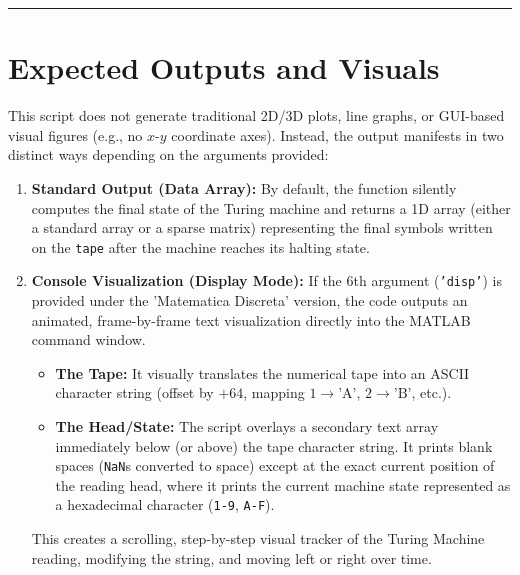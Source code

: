 \vspace{1em}
\hrule
\vspace{1em}

\section*{Expected Outputs and Visuals}

This script does not generate traditional 2D/3D plots, line graphs, or GUI-based visual figures (e.g., no $x$-$y$ coordinate axes). Instead, the output manifests in two distinct ways depending on the arguments provided:

\begin{enumerate}
    \item \textbf{Standard Output (Data Array):} By default, the function silently computes the final state of the Turing machine and returns a 1D array (either a standard array or a sparse matrix) representing the final symbols written on the \texttt{tape} after the machine reaches its halting state. 
    \item \textbf{Console Visualization (Display Mode):} If the 6th argument (\texttt{'disp'}) is provided under the 'Matematica Discreta' version, the code outputs an animated, frame-by-frame text visualization directly into the MATLAB command window. 
    \begin{itemize}
        \item \textbf{The Tape:} It visually translates the numerical tape into an ASCII character string (offset by $+64$, mapping $1 \rightarrow \text{'A'}$, $2 \rightarrow \text{'B'}$, etc.). 
        \item \textbf{The Head/State:} The script overlays a secondary text array immediately below (or above) the tape character string. It prints blank spaces (\texttt{NaN}s converted to space) except at the exact current position of the reading head, where it prints the current machine state represented as a hexadecimal character (\texttt{1-9}, \texttt{A-F}).
    \end{itemize}
    This creates a scrolling, step-by-step visual tracker of the Turing Machine reading, modifying the string, and moving left or right over time.
\end{enumerate}
